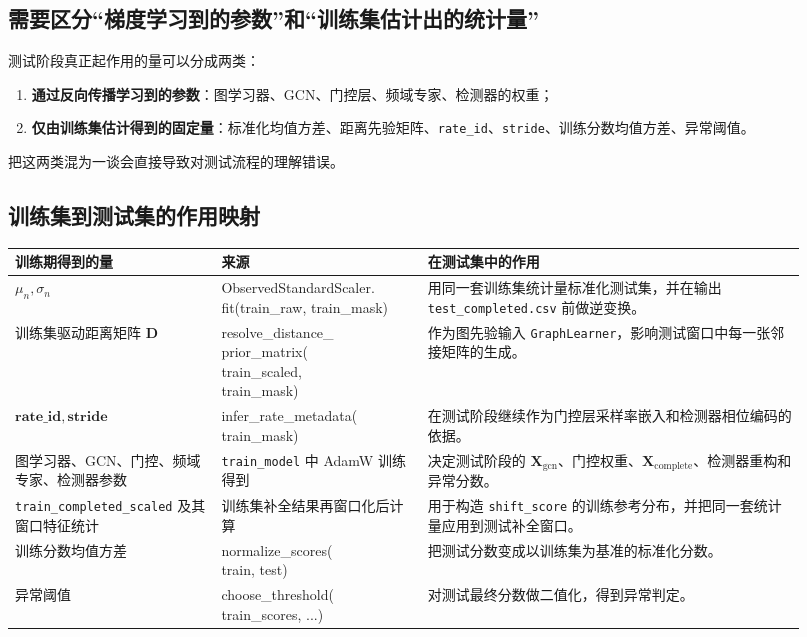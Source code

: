 \documentclass[UTF8]{ctexart}
\newcommand{\codecell}[1]{\parbox[t]{\linewidth}{\raggedright\ttfamily\small #1}}
\begin{document}
\subsection{需要区分“梯度学习到的参数”和“训练集估计出的统计量”}

测试阶段真正起作用的量可以分成两类：
\begin{enumerate}
    \item \textbf{通过反向传播学习到的参数}：图学习器、GCN、门控层、频域专家、检测器的权重；
    \item \textbf{仅由训练集估计得到的固定量}：标准化均值方差、距离先验矩阵、\texttt{rate\_id}、\texttt{stride}、训练分数均值方差、异常阈值。
\end{enumerate}

把这两类混为一谈会直接导致对测试流程的理解错误。

\subsection{训练集到测试集的作用映射}

{\small
\begin{longtable}{@{}>{\raggedright\arraybackslash}p{0.24\linewidth} >{\raggedright\arraybackslash}p{0.24\linewidth} >{\raggedright\arraybackslash}p{0.44\linewidth}@{}}
\toprule
训练期得到的量 & 来源 & 在测试集中的作用 \\
\midrule
\endhead
\(\mu_n,\sigma_n\) & \codecell{ObservedStandardScaler.\\fit(train\_raw, train\_mask)} & 用同一套训练集统计量标准化测试集，并在输出 \texttt{test\_completed.csv} 前做逆变换。 \\
训练集驱动距离矩阵 \(\bm{D}\) & \codecell{resolve\_distance\_\\prior\_matrix(\\train\_scaled,\\train\_mask)} & 作为图先验输入 \texttt{GraphLearner}，影响测试窗口中每一张邻接矩阵的生成。 \\
\(\bm{rate\_id},\bm{stride}\) & \codecell{infer\_rate\_metadata(\\train\_mask)} & 在测试阶段继续作为门控层采样率嵌入和检测器相位编码的依据。 \\
图学习器、GCN、门控、频域专家、检测器参数 & \texttt{train\_model} 中 AdamW 训练得到 & 决定测试阶段的 \(\bm{X}_{\text{gcn}}\)、门控权重、\(\bm{X}_{\text{complete}}\)、检测器重构和异常分数。 \\
\texttt{train\_completed\_scaled} 及其窗口特征统计 & 训练集补全结果再窗口化后计算 & 用于构造 \texttt{shift\_score} 的训练参考分布，并把同一套统计量应用到测试补全窗口。 \\
训练分数均值方差 & \codecell{normalize\_scores(\\train, test)} & 把测试分数变成以训练集为基准的标准化分数。 \\
异常阈值 & \codecell{choose\_threshold(\\train\_scores, ...)} & 对测试最终分数做二值化，得到异常判定。 \\
\bottomrule
\end{longtable}
}
\end{document}
